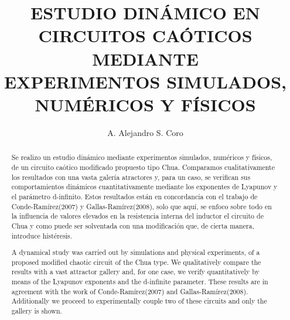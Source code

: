 \documentclass{rbf}
\begin{document}
\title{ESTUDIO DINÁMICO EN CIRCUITOS CAÓTICOS MEDIANTE \\EXPERIMENTOS SIMULADOS,  NUMÉRICOS Y FÍSICOS}

\author{A. Alejandro S. Coro\marca{\dag}}
\\

\begin{abstract}
\Resumen
Se realizo un estudio dinámico mediante experimentos simulados, numéricos y físicos, de un circuito caótico modificado propuesto tipo Chua. Comparamos cualitativamente los resultados con una vasta galería atractores y, para un caso, se verifican sus comportamientos dinámicos cuantitativamente mediante los exponentes de Lyapunov y el parámetro d-infinito. Estos resultados están en concordancia con el trabajo de Conde-Ramírez(2007) y Gallas-Ramírez(2008), solo que aquí, se enfoco sobre todo en la influencia de valores elevados en la resistencia interna del inductor el circuito de Chua y como puede ser solventada con una modificación que, de cierta manera, introduce histéresis. 

\Abstract 
A dynamical study was carried out by simulations and physical experiments, of a proposed modified chaotic circuit of the Chua type. We qualitatively compare the results with a vast attractor gallery and, for one case, we verify quantitatively by means of the Lyapunov exponents and the d-infinite parameter. These results are in agreement with the work of Conde-Ramírez(2007) and Gallas-Ramírez(2008). Additionally we proceed to experimentally couple two of these circuits and only the gallery is shown.

\end{abstract}


\end{document}
